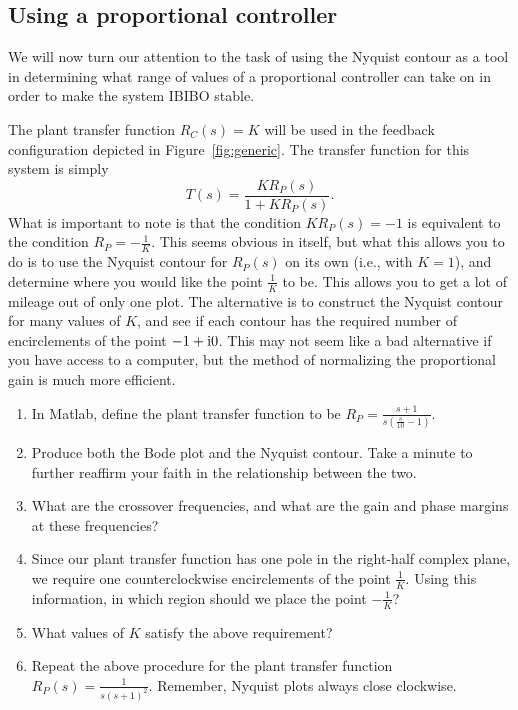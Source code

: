\subsection{Using a proportional controller}

We will now turn our attention to the task of using the Nyquist contour as a
tool in determining what range of values of a proportional controller can
take on in order to make the system IBIBO stable.

The plant transfer function \(R_{C}(s) = K\) will be used in the feedback
configuration depicted in Figure~\ref{fig:generic}\@.  The transfer function
for this system is simply
\begin{equation*}
    T(s)=\frac{KR_{P}(s)}{1+KR_{P}(s)}.
\end{equation*}
What is important to note is that the condition \(KR_{P}(s)=-1\) is equivalent
to the condition \(R_{P}=-\frac{1}{K}\). This seems obvious in itself, but what
this allows you to do is to use the Nyquist contour for \(R_{P}(s)\) on its own
(i.e., with \(K=1\)), and determine where you would like the point
\(\frac{1}{K}\) to be. This allows you to get a lot of mileage out of only one
plot. The alternative is to construct the Nyquist contour for many values of
\(K\), and see if each contour has the required number of encirclements of the
point \(-1+\textup{i}0\).  This may not seem like a bad alternative if you have
access to a computer, but the method of normalizing the proportional gain is
much more efficient.

\begin{enumerate}
    \item In \textsf{Matlab}, define the plant transfer function to be
          \(R_{P}=\frac{s+1}{s(\frac{s}{10}-1)}\).

    \item Produce both the Bode plot and the Nyquist contour.  Take a minute to
          further reaffirm your faith in the relationship between the two.

    \item What are the crossover frequencies, and what are the gain and phase
          margins at these frequencies?

    \item Since our plant transfer function has one pole in the right-half
          complex plane, we require one counterclockwise encirclements of the point
          \(\frac{1}{K}\). Using this information, in which region should we place the
          point \(-\frac{1}{K}\)?

    \item What values of \(K\) satisfy the above requirement?

    \item Repeat the above procedure for the plant transfer function
          \(R_{P}(s)=\frac{1}{s{(s+1)}^{2}}\).  Remember, Nyquist plots always close
          clockwise.
\end{enumerate}

